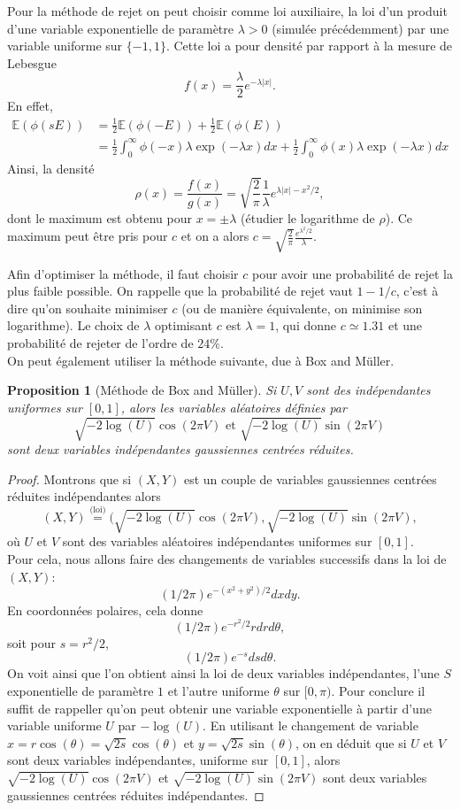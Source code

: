 \documentclass[a4paper,12pt]{book}
\newtheorem{propfr}[thmfr]{Proposition}
\begin{document}
Pour la m\'ethode de rejet on peut choisir comme loi auxiliaire, la loi d'un produit d'une variable exponentielle de param\`etre $\lambda >0 $ (simul\'ee pr\'ec\'edemment) par une variable uniforme sur $\{-1,1\}$.
Cette loi a pour densité par rapport \`a la mesure de Lebesgue
$$f(x)=\frac{\lambda}{2} e^{-\lambda|x|}.$$
En effet,
$$\begin{aligned}
\mathbb{E}(\phi(sE))&=\frac{1}{2}\mathbb{E}(\phi(-E))+\frac{1}{2}\mathbb{E}(\phi(E))\\
&=\frac{1}{2}\int_0^\infty \phi(-x)\lambda \exp(-\lambda x) dx +\frac{1}{2}\int_0^\infty \phi(x)\lambda \exp(-\lambda x) dx
\end{aligned}$$
Ainsi, la densité
$$\rho(x) =\frac{f(x)}{g(x)}= \sqrt{\frac{2}{\pi }}\frac{1}{\lambda}e^{\lambda|x|-x^2/2},$$
dont le maximum est obtenu pour $ x = \pm \lambda$ (étudier le logarithme de $\rho$). Ce maximum peut \^etre pris pour $c$ et on a alors
$c =  \sqrt{\frac{2}{\pi }}\frac{e^{\lambda^2/2}}{ \lambda}$.

Afin d'optimiser la méthode, il faut choisir $c$ pour avoir une probabilité de rejet la plus faible possible. On rappelle que la probabilité de rejet vaut $1-1/c$, c'est à dire qu'on souhaite minimiser $c$ (ou de manière équivalente, on minimise son logarithme). Le choix de $\lambda$ optimisant $c$ est $\lambda = 1$, qui donne $c \simeq 1.31$ et une probabilité de rejeter de l'ordre de $24\%$. \bigskip\\
On peut \'egalement utiliser la m\'ethode suivante, due \`a  Box and M\"uller.
\begin{propfr}[Méthode de Box and M\"uller]
Si $U,V$ sont des ind\'ependantes uniformes sur $[0,1]$, alors les variables aléatoires définies par
$$ \sqrt{- 2 \log (U)} \cos(2 \pi V)\text{ et }\sqrt{- 2 \log (U)} \sin(2 \pi V)$$
sont deux variables ind\'ependantes gaussiennes centr\'ees r\'eduites.
\end{propfr}
\begin{proof}
Montrons que si $(X,Y)$ est un couple de variables gaussiennes centrées réduites indépendantes alors
$$ (X,Y) \overset{\text{(loi)}}{=} (\sqrt{- 2 \log (U)} \cos(2 \pi V),\sqrt{- 2 \log (U)} \sin(2 \pi V),$$
où $U$ et $V$ sont des variables aléatoires indépendantes uniformes sur $[0,1]$.\medskip\\
Pour cela, nous allons faire des changements de variables successifs dans la loi de $(X,Y)$:
$$(1/2\pi) e^{-(x^2 + y^2)/2} dx dy.$$
En coordonn\'ees polaires, cela donne
$$(1/2\pi)e^{-r^2/2} r dr d\theta,$$
soit pour $s = r^2/2$,
$$(1/2\pi) e^{-s} ds d \theta.$$
On voit ainsi que l'on obtient ainsi la loi de deux variables ind\'ependantes, l'une $S$ exponentielle de param\`etre $1$ et l'autre uniforme $\theta$ sur $[0, \pi)$. Pour conclure il suffit de rappeller qu'on peut obtenir une variable exponentielle à partir d'une variable uniforme $U$ par $-\log(U)$. En utilisant le changement de variable $x = r \cos (\theta) = \sqrt{2 s} \cos (\theta)$ et $y = \sqrt{2s} \sin (\theta)$, on en d\'eduit que si $U$ et $V$ sont deux variables ind\'ependantes, uniforme sur $[0,1]$, alors $\sqrt{- 2 \log (U)} \cos(2 \pi V)$ et $\sqrt{- 2 \log (U)} \sin(2 \pi V)$ sont deux variables gaussiennes centr\'ees r\'eduites ind\'ependantes.
\end{proof}
\end{document}
